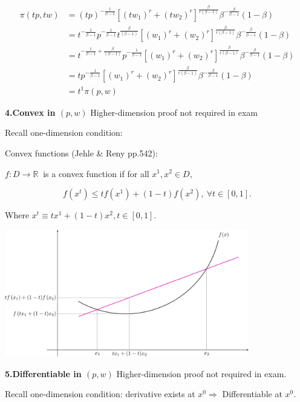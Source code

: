 \documentclass{article}
\newcommand{\R}{\mathbb{R}}
\begin{document}
\begin{align*}
\pi(tp,tw) &= (tp)^{-\frac{1}{\beta - 1}} [(tw_1)^r + (tw_2)^r]^{\frac{\beta}{r(\beta - 1)}}\beta^{-\frac{\beta}{\beta - 1}}(1-\beta) \\
&= t^{-\frac{1}{\beta - 1}}p^{-\frac{1}{\beta - 1}} t^{\frac{\beta}{(\beta - 1)}} [(w_1)^r + (w_2)^r]^{\frac{\beta}{r(\beta - 1)}}\beta^{-\frac{\beta}{\beta - 1}}(1-\beta) \\
&= t^{-\frac{1}{\beta - 1} + \frac{\beta}{(\beta - 1)}}p^{-\frac{1}{\beta - 1}} [(w_1)^r + (w_2)^r]^{\frac{\beta}{r(\beta - 1)}}\beta^{-\frac{\beta}{\beta - 1}}(1-\beta) \\
&= tp^{-\frac{1}{\beta - 1}} [(w_1)^r + (w_2)^r]^{\frac{\beta}{r(\beta - 1)}}\beta^{-\frac{\beta}{\beta - 1}}(1-\beta) \\
&= t^1\pi(p,w) 
\end{align*}

\vspace{3mm}
\begin{mdframed}[backgroundcolor=blue!20,linecolor=white]
\textbf{4.Convex in $(p,w)$}
Higher-dimension proof not required in exam

Recall one-dimension condition: 

Convex functions (Jehle \& Reny pp.542):

$f : D \to \R \ $ is a convex function if for all $x^1, x^2 \in D$,

$$f(x^t) \le tf(x^1) + (1 - t)f(x^2), \ \forall t \in [0, 1].$$

Where $x^t \equiv tx^1 + (1-t)x^2, t \in [0,1].$

\vspace{2mm}
{\centering
\includegraphics[width=0.8\textwidth]{5.convex}
\label{fig:convex}}
\vspace{2mm}

\textbf{5.Differentiable in $(p,w)$}
Higher-dimension proof not required in exam.

Recall one-dimension condition: derivative exists at $x^0 \Rightarrow$ Differentiable at $x^0$.

\end{mdframed}
\end{document}
